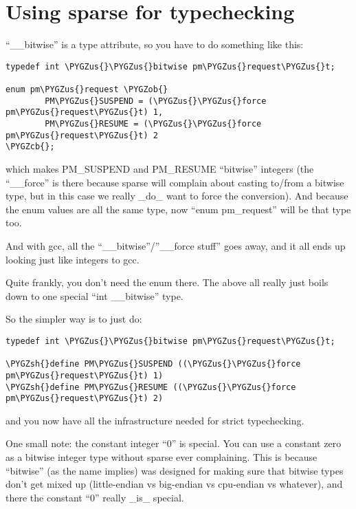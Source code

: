 \documentclass[a4paper,8pt,english]{sphinxmanual}
\def\PYGZus{\char`\_}
\def\PYGZob{\char`\{}
\def\PYGZcb{\char`\}}
\def\PYGZsh{\char`\#}
\begin{document}
\section{Using sparse for typechecking}
\label{dev-tools/sparse:using-sparse-for-typechecking}
``\_\_bitwise'' is a type attribute, so you have to do something like this:

\begin{Verbatim}[commandchars=\\\{\}]
typedef int \PYGZus{}\PYGZus{}bitwise pm\PYGZus{}request\PYGZus{}t;

enum pm\PYGZus{}request \PYGZob{}
        PM\PYGZus{}SUSPEND = (\PYGZus{}\PYGZus{}force pm\PYGZus{}request\PYGZus{}t) 1,
        PM\PYGZus{}RESUME = (\PYGZus{}\PYGZus{}force pm\PYGZus{}request\PYGZus{}t) 2
\PYGZcb{};
\end{Verbatim}

which makes PM\_SUSPEND and PM\_RESUME ``bitwise'' integers (the ``\_\_force'' is
there because sparse will complain about casting to/from a bitwise type,
but in this case we really \_do\_ want to force the conversion). And because
the enum values are all the same type, now ``enum pm\_request'' will be that
type too.

And with gcc, all the ``\_\_bitwise''/''\_\_force stuff'' goes away, and it all
ends up looking just like integers to gcc.

Quite frankly, you don't need the enum there. The above all really just
boils down to one special ``int \_\_bitwise'' type.

So the simpler way is to just do:

\begin{Verbatim}[commandchars=\\\{\}]
typedef int \PYGZus{}\PYGZus{}bitwise pm\PYGZus{}request\PYGZus{}t;

\PYGZsh{}define PM\PYGZus{}SUSPEND ((\PYGZus{}\PYGZus{}force pm\PYGZus{}request\PYGZus{}t) 1)
\PYGZsh{}define PM\PYGZus{}RESUME ((\PYGZus{}\PYGZus{}force pm\PYGZus{}request\PYGZus{}t) 2)
\end{Verbatim}

and you now have all the infrastructure needed for strict typechecking.

One small note: the constant integer ``0'' is special. You can use a
constant zero as a bitwise integer type without sparse ever complaining.
This is because ``bitwise'' (as the name implies) was designed for making
sure that bitwise types don't get mixed up (little-endian vs big-endian
vs cpu-endian vs whatever), and there the constant ``0'' really \_is\_
special.
\end{document}
